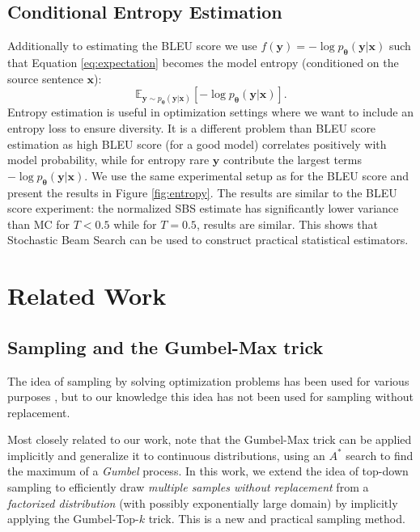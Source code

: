 \subsection{Conditional Entropy Estimation}
Additionally to estimating the BLEU score we use $f(\bm{y}) = -\log p_{\bm{\theta}}(\bm{y}|\bm{x})$ such that Equation \eqref{eq:expectation} becomes the model entropy (conditioned on the source sentence $\bm{x}$):
\begin{equation*}
    \mathbb{E}_{\bm{y} \sim p_{\bm{\theta}}(\bm{y}|\bm{x})} \left[-\log p_{\bm{\theta}}(\bm{y}|\bm{x})\right].
\end{equation*}
Entropy estimation is useful in optimization settings where we want to include an entropy loss to ensure diversity. It is a different problem than BLEU score estimation as high BLEU score (for a good model) correlates positively with model probability, while for entropy rare $\bm{y}$ contribute the largest terms $-\log p_{\bm{\theta}}(\bm{y}|\bm{x})$. We use the same experimental setup as for the BLEU score and present the results in Figure \ref{fig:entropy}. The results are similar to the BLEU score experiment: the normalized SBS estimate has significantly lower variance than MC for $T < 0.5$ while for $T = 0.5$, results are similar. This shows that Stochastic Beam Search can be used to construct practical statistical estimators.

\section{Related Work}

\subsection{Sampling and the Gumbel-Max trick}
The idea of sampling by solving optimization problems has been used for various purposes \citep{papandreou2011perturb, hazan2012partition, tarlow2012randomized, ermon2013embed,  maddison2014sampling, chen2016scalable, balog2017lost}, but to our knowledge this idea has not been used for sampling without replacement.

Most closely related to our work, \citet{maddison2014sampling} note that the Gumbel-Max trick \citep{gumbel1954statistical} can be applied implicitly and generalize it to continuous distributions, using an $A^*$ search to find the maximum of a \emph{Gumbel} process.
In this work, we extend the idea of top-down sampling to efficiently draw \emph{multiple samples without replacement} from a  \emph{factorized distribution} (with possibly exponentially large domain) by implicitly applying the Gumbel-Top-$k$ trick.
This is a new and practical sampling method.


